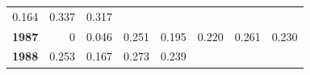 \documentclass[]{article}
\begin{document}
\begin{longtable}[]{@{}rrrrrrrr@{}}
\begin{minipage}[t]{0.09\columnwidth}
0.164\strut
\end{minipage} & \begin{minipage}[t]{0.08\columnwidth}\raggedleft\strut
0.337\strut
\end{minipage} & \begin{minipage}[t]{0.10\columnwidth}\raggedleft\strut
0.317\strut
\end{minipage}\tabularnewline
\begin{minipage}[t]{0.08\columnwidth}\raggedleft\strut
\textbf{1987}\strut
\end{minipage} & \begin{minipage}[t]{0.10\columnwidth}\raggedleft\strut
0\strut
\end{minipage} & \begin{minipage}[t]{0.11\columnwidth}\raggedleft\strut
0.046\strut
\end{minipage} & \begin{minipage}[t]{0.08\columnwidth}\raggedleft\strut
0.251\strut
\end{minipage} & \begin{minipage}[t]{0.14\columnwidth}\raggedleft\strut
0.195\strut
\end{minipage} & \begin{minipage}[t]{0.09\columnwidth}\raggedleft\strut
0.220\strut
\end{minipage} & \begin{minipage}[t]{0.08\columnwidth}\raggedleft\strut
0.261\strut
\end{minipage} & \begin{minipage}[t]{0.10\columnwidth}\raggedleft\strut
0.230\strut
\end{minipage}\tabularnewline
\begin{minipage}[t]{0.08\columnwidth}\raggedleft\strut
\textbf{1988}\strut
\end{minipage} & \begin{minipage}[t]{0.10\columnwidth}\raggedleft\strut
0.253\strut
\end{minipage} & \begin{minipage}[t]{0.11\columnwidth}\raggedleft\strut
0.167\strut
\end{minipage} & \begin{minipage}[t]{0.08\columnwidth}\raggedleft\strut
0.273\strut
\end{minipage} & \begin{minipage}[t]{0.14\columnwidth}\raggedleft\strut
0.239\strut
\end{minipage} & \begin{minipage}[t]{0.09\columnwidth}\raggedleft\strut

\end{minipage}
\end{longtable}
\end{document}
